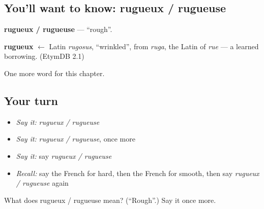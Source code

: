 \subsection*{You'll want to know: rugueux / rugueuse}
\textbf{rugueux / rugueuse} — \textquotedblleft{}rough\textquotedblright{}.

\begin{cousinweb}
\textbf{rugueux} $\leftarrow$ Latin \emph{rugosus}, \textquotedblleft{}wrinkled\textquotedblright{}, from \emph{ruga}, the Latin of \emph{rue} — a learned borrowing. (EtymDB 2.1)
\end{cousinweb}

\begin{grammarlens}[title={What you've built}]
One more word for this chapter.
\end{grammarlens}

\subsection*{Your turn}
\begin{itemize}
\raggedright
  \item \emph{Say it:} \emph{rugueux / rugueuse}
  \item \emph{Say it:} \emph{rugueux / rugueuse}, once more
  \item \emph{Say it:} say \emph{rugueux / rugueuse}
  \item \emph{Recall:} say the French for hard, then the French for smooth, then say \emph{rugueux / rugueuse} again
\end{itemize}

\begin{tcolorbox}[breakable,colback=teal!4,colframe=teal!35!black,title={Before you move on}]
What does rugueux / rugueuse mean? (\textquotedblleft{}Rough\textquotedblright{}.) Say it once more.
\end{tcolorbox}
